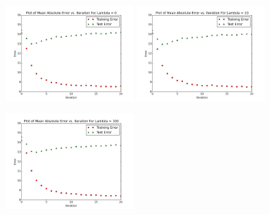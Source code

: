 \documentclass[12pt]{article}
\newcommand{\factwidth}{0.44}
\newcommand{\factheight}{1.6in}
\begin{document}
\begin{figure}[H]
\centering
\includegraphics[width=0\factwidth\textwidth,height=\factheight]{matrix_plots/test-i40d40l0.png}
\includegraphics[width=0\factwidth\textwidth,height=\factheight]{matrix_plots/test-i40d40l10.png}
\includegraphics[width=0\factwidth\textwidth,height=\factheight]{matrix_plots/test-i40d40l100.png}

\end{figure}
\end{document}
